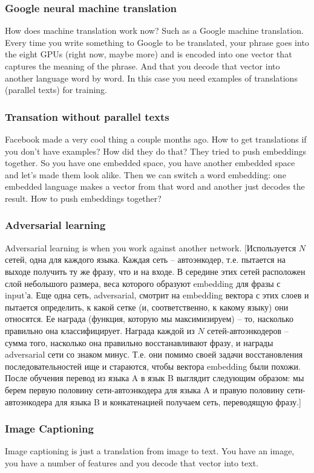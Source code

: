 \subsubsection*{Google neural machine translation}

How does machine translation work now? Such as a Google machine translation. Every time you write something to Google to be translated, your phrase goes into the eight GPUs (right now, maybe more) and is encoded into one vector that captures the meaning of the phrase. And that you decode that vector into another language word by word. In this case you need examples of translations (parallel texts) for training.

\subsubsection*{Transation without parallel texts}

Facebook made a very cool thing a couple months ago. How to get translations if you don't have examples? How did they do that? They tried to push embeddings together. So you have one embedded space, you have another embedded space and let's made them look alike. Then we can switch a word embedding: one embedded language makes a vector from that word and another just decodes the result. How to push embeddings together?

\vspace{-0.3cm}
\subsubsection*{Adversarial learning}

Adversarial learning is when you work against another network. [Используется $N$ сетей, одна для каждого языка. Каждая сеть -- автоэнкодер, т.е. пытается на выходе получить ту же фразу, что и на входе. В середине этих сетей расположен слой небольшого размера, веса которого образуют embedding для фразы с input'а. Еще одна сеть, adversarial, смотрит на embedding вектора с этих слоев и пытается определить, к какой сетке (и, соответственно, к какому языку) они относятся. Ее награда (функция, которую мы максимизируем) -- то, насколько правильно она классифицирует. Награда каждой из $N$ сетей-автоэнкодеров -- сумма того, насколько она правильно восстанавливают фразу, и награды adversarial сети со знаком минус. Т.е. они помимо своей задачи восстановления последовательностей ище и стараются, чтобы вектора embedding были похожи. После обучения перевод из языка A в язык B выглядит следующим образом: мы берем первую половину сети-автоэнкодера для языка A и правую половину сети-автоэнкодера для языка B и конкатенацией получаем сеть, переводящую фразу.]

\vspace{-0.3cm}
\subsubsection*{Image Captioning}

Image captioning is just a translation from image to text. You have an image, you have a number of features and you decode that vector into text.
